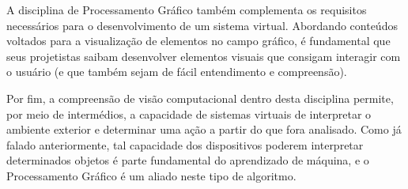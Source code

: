 \documentclass[a4paper, 12pt]{article}
\begin{document}
A disciplina de Processamento Gráfico também complementa os requisitos necessários para o desenvolvimento de um sistema virtual. Abordando conteúdos voltados para a visualização de elementos no campo gráfico, é fundamental que seus projetistas saibam desenvolver elementos visuais que consigam interagir com o usuário (e que também sejam de fácil entendimento e compreensão). 

Por fim, a compreensão de visão computacional dentro desta disciplina permite, por meio de intermédios, a capacidade de sistemas virtuais de interpretar o ambiente exterior e determinar uma ação a partir do que fora analisado. Como já falado anteriormente, tal capacidade dos dispositivos poderem interpretar determinados objetos é parte fundamental do aprendizado de máquina, e o Processamento Gráfico é um aliado neste tipo de algoritmo.

\newpage


\end{document}
